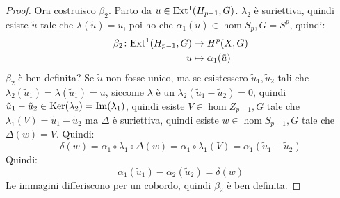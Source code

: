 \begin{proof}
  Ora costruisco $ \beta_2 $. Parto da $ u \in \mathrm{Ext^1}( H_{p-1}, G) $.
  $ \lambda_2 $ è suriettiva, quindi esiste $ \tilde{u} $ tale che
  $ \lambda(\tilde{u}) = u $, poi ho che $ \alpha_1(\tilde{u}) \in \hom{S_p, G} = S^p $,
  quindi:
  \begin{align*}
    \beta_2 \colon \mathrm{Ext^1}( H_{p-1}, G) & \to H^p(X,G) \\
    u & \mapsto \alpha_1(\tilde{u})
  \end{align*}
  $ \beta_2 $ è ben definita? Se $ \tilde{u} $ non fosse unico, ma se esistessero
  $ \tilde{u}_1, \tilde{u}_2 $ tali che
  $ \lambda_2(\tilde{u}_1) = \lambda(\tilde{u}_1) = u $, siccome $ \lambda $ è un
  $ \lambda_2(\tilde{u}_1 - \tilde{u}_2) = 0 $, quindi
  $ \tilde{u}_1 - \tilde{u}_2 \in \mathrm{Ker}( \lambda_2) = \mathrm{Im}( \lambda_1 ) $, quindi esiste
  $ V \in \hom{Z_{p-1}, G} $ tale che $ \lambda_1(V) = \tilde{u}_1 - \tilde{u}_2 $
  ma $ \Delta $ è suriettiva, quindi esiste $ w \in \hom{S_{p-1}, G} $ tale
  che $ \Delta(w) = V $.
  Quindi:
  \[
    \delta(w) = \alpha_1 \circ \lambda_1 \circ \Delta (w) = \alpha_1 \circ \lambda_1 (V) = \alpha_1 ( \tilde{u}_1 - \tilde{u}_2 )
  \]
  Quindi:
  \[
    \alpha_1(\tilde{u}_1) - \alpha_2(\tilde{u}_2) = \delta(w)
  \]
  Le immagini differiscono per un cobordo, quindi $ \beta_2 $ è ben definita.


\end{proof}
